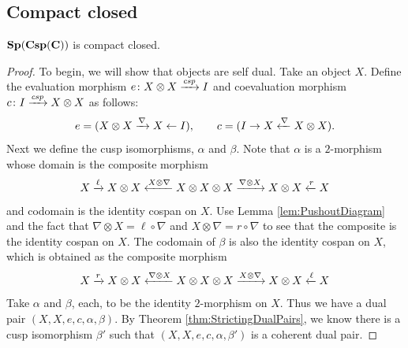 \documentclass[./Spans_of_cospans_II.tex]{subfiles}
\begin{document}
\subsection{Compact closed} %
\label{subsec.SpansCospansAreCCBicats}

\begin{thm}
	\label{thm:SpansCospansAreCCBicat}
	$\mathbf{Sp(Csp(C))}$ is compact closed.
\end{thm}

\begin{proof}
	To begin, we will show that objects are self dual. Take an object $X$.  Define the evaluation morphism $e \colon X \otimes X \xrightarrow{\mathit{csp}} I$ and coevaluation morphism $c \colon I \xrightarrow{\mathit{csp}} X\otimes X$ as follows:
	\[
	e = (X\otimes X \xrightarrow{\nabla} X \gets I), \quad \quad 
	c = (I \to X \xleftarrow{\nabla} X \otimes X).
	\]
	Next we define the cusp isomorphisms, $\alpha$ and $\beta$.
	Note that $\alpha$ is a $2$-morphism whose domain is the composite morphism
	\[
	X \xrightarrow{\ell}
	X\otimes X \xleftarrow{X\otimes \nabla}
	X\otimes X\otimes X \xrightarrow{\nabla \otimes X}
	X\otimes X \xleftarrow{r}
	X
	\]
	and codomain is the identity cospan on $X$.  Use Lemma \ref{lem:PushoutDiagram} and the fact that $\nabla\otimes X = \ell \circ \nabla$ and $X \otimes  \nabla = r \circ \nabla$ to see that the composite is the identity cospan on $X$.  The codomain of $\beta$ is also the identity cospan on $X$, which is obtained as the composite morphism
	\[
	X \xrightarrow{r}
	X\otimes X \xleftarrow{\nabla\otimes X}
	X\otimes X\otimes X \xrightarrow{X\otimes \nabla}
	X\otimes X \xleftarrow{\ell}
	X
	\]
	Take $\alpha$ and $\beta$, each, to be the identity $2$-morphism on $X$. Thus we have a dual pair $(X,X,e,c,\alpha,\beta)$. By Theorem \ref{thm:StrictingDualPairs}, we know there is a cusp isomorphism $\beta'$ such that $(X,X,e,c,\alpha,\beta')$ is a coherent dual pair.  
\end{proof}


%
\end{document}
